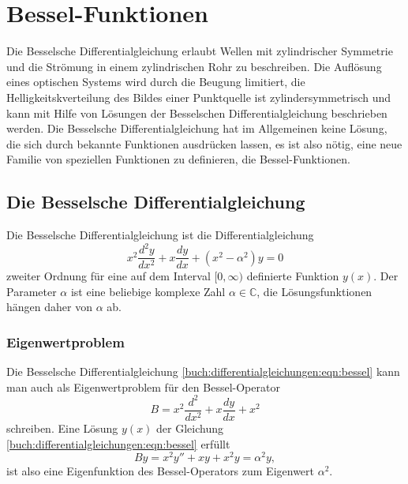 %
%
%
\section{Bessel-Funktionen
\label{buch:differntialgleichungen:section:bessel}}
Die Besselsche Differentialgleichung
erlaubt Wellen mit zylindrischer
Symmetrie und die Strömung in einem zylindrischen Rohr zu beschreiben.
Die Auflösung eines optischen Systems wird durch die Beugung limitiert,
die Helligkeitskverteilung des Bildes einer Punktquelle ist
zylindersymmetrisch und kann mit Hilfe von Lösungen der Besselschen
Differentialgleichung beschrieben werden.
Die Besselsche Differentialgleichung hat im Allgemeinen keine Lösung,
die sich durch bekannte Funktionen ausdrücken lassen, es ist also
nötig, eine neue Familie von speziellen Funktionen zu definieren,
die Bessel-Funktionen.

\subsection{Die Besselsche Differentialgleichung}
Die Besselsche Differentialgleichung ist die Differentialgleichung
\begin{equation}
x^2\frac{d^2y}{dx^2} + x\frac{dy}{dx} + (x^2-\alpha^2)y = 0
\label{buch:differentialgleichungen:eqn:bessel}
\end{equation}
zweiter Ordnung
für eine auf dem Interval $[0,\infty)$ definierte Funktion $y(x)$.
Der Parameter $\alpha$ ist eine beliebige komplexe Zahl $\alpha\in \mathbb{C}$,
die Lösungsfunktionen hängen daher von $\alpha$ ab.

\subsubsection{Eigenwertproblem}
Die Besselsche Differentialgleichung
\eqref{buch:differentialgleichungen:eqn:bessel}
kann man auch als Eigenwertproblem für den Bessel-Operator
%
\begin{equation}
B = x^2\frac{d^2}{dx^2} + x\frac{dy}{dx} + x^2
\label{buch:differentialgleichungen:bessel-operator}
\end{equation}
schreiben.
Eine Lösung $y(x)$ der Gleichung
\eqref{buch:differentialgleichungen:eqn:bessel}
erfüllt
\[
By
=
x^2y''+xy+x^2y
=\alpha^2 y,
\]
ist also eine Eigenfunktion des Bessel-Operators zum Eigenwert
$\alpha^2$.

